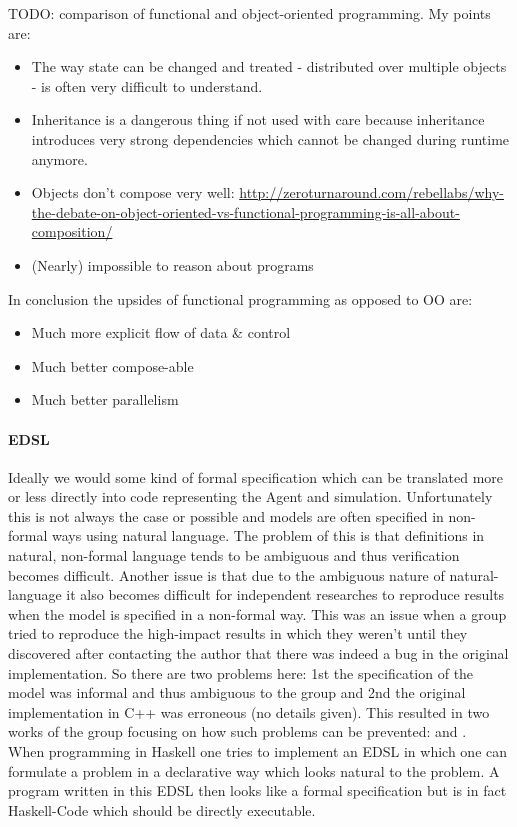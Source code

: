 TODO: comparison of functional and object-oriented programming. My points are:
\begin{itemize}
\item The way state can be changed and treated - distributed over multiple objects - is often very difficult to understand.
\item Inheritance is a dangerous thing if not used with care because inheritance introduces very strong dependencies which cannot be changed during runtime anymore.
\item Objects don't compose very well: \url{http://zeroturnaround.com/rebellabs/why-the-debate-on-object-oriented-vs-functional-programming-is-all-about-composition/}
\item (Nearly) impossible to reason about programs
\end{itemize}

In conclusion the upsides of functional programming as opposed to OO are:
\begin{itemize}
\item Much more explicit flow of data \& control
\item Much better compose-able
\item Much better parallelism
\end{itemize}

\paragraph{EDSL}
Ideally we would some kind of formal specification which can be translated more or less directly into code representing the Agent and simulation. Unfortunately this is not always the case or possible and models are often specified in non-formal ways using natural language. The problem of this is that definitions in natural, non-formal language tends to be ambiguous and thus verification becomes difficult. Another issue is that due to the ambiguous nature of natural-language it also becomes difficult for independent researches to reproduce results when the model is specified in a non-formal way. This was an issue when a group tried to reproduce the high-impact results in \cite{gintis_emergence_2006} which they weren't until they discovered after contacting the author that there was indeed a bug in the original implementation. So there are two problems here: 1st the specification of the model was informal and thus ambiguous to the group and 2nd the original implementation in C++ was erroneous (no details given). This resulted in two works of the group focusing on how such problems can be prevented: \cite{ionescu_dependently-typed_2012} and \cite{botta_functional_2011}. \\
When programming in Haskell one tries to implement an EDSL in which one can formulate a problem in a declarative way which looks natural to the problem. A program written in this EDSL then looks like a formal specification but is in fact Haskell-Code which should be directly executable.

